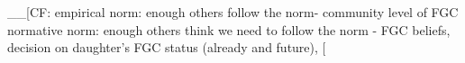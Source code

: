 \documentclass[12pt,]{article}
\begin{document}
 
\_\_{[}CF: empirical norm:  enough others follow the norm-  community level of FGC \cite{Bicc10} normative norm:  enough others think we need to follow the norm -  FGC beliefs, decision on daughter's FGC status (already and future), \cite{Bicc10}{[}








\end{document}
